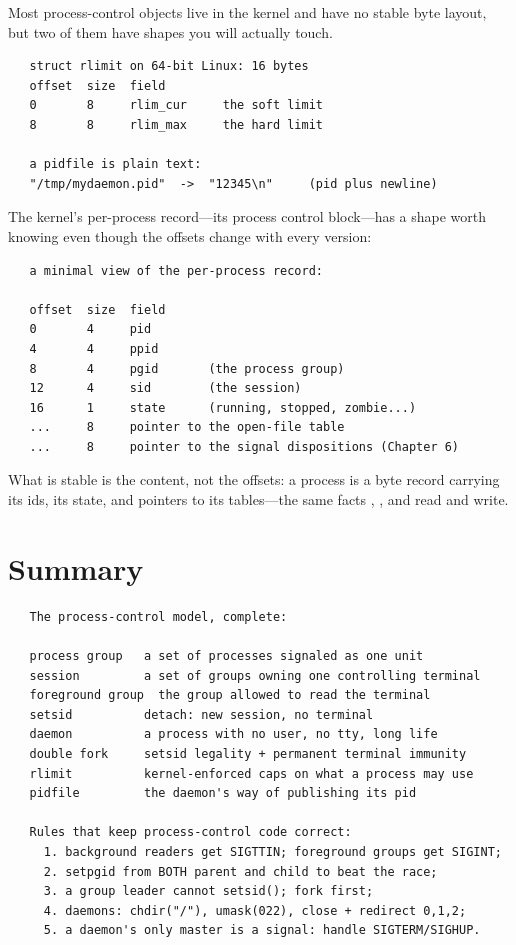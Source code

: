 Most process-control objects live in the kernel and have no stable
byte layout, but two of them have shapes you will actually touch.

\begin{verbatim}
   struct rlimit on 64-bit Linux: 16 bytes
   offset  size  field
   0       8     rlim_cur     the soft limit
   8       8     rlim_max     the hard limit

   a pidfile is plain text:
   "/tmp/mydaemon.pid"  ->  "12345\n"     (pid plus newline)
\end{verbatim}

The kernel's per-process record---its process control block---has a
shape worth knowing even though the offsets change with every version:

\begin{verbatim}
   a minimal view of the per-process record:

   offset  size  field
   0       4     pid
   4       4     ppid
   8       4     pgid       (the process group)
   12      4     sid        (the session)
   16      1     state      (running, stopped, zombie...)
   ...     8     pointer to the open-file table
   ...     8     pointer to the signal dispositions (Chapter 6)
\end{verbatim}

What is stable is the content, not the offsets: a process is a byte
record carrying its ids, its state, and pointers to its tables---the
same facts , , and 
read and write.

\section{Summary}

\begin{verbatim}
   The process-control model, complete:

   process group   a set of processes signaled as one unit
   session         a set of groups owning one controlling terminal
   foreground group  the group allowed to read the terminal
   setsid          detach: new session, no terminal
   daemon          a process with no user, no tty, long life
   double fork     setsid legality + permanent terminal immunity
   rlimit          kernel-enforced caps on what a process may use
   pidfile         the daemon's way of publishing its pid

   Rules that keep process-control code correct:
     1. background readers get SIGTTIN; foreground groups get SIGINT;
     2. setpgid from BOTH parent and child to beat the race;
     3. a group leader cannot setsid(); fork first;
     4. daemons: chdir("/"), umask(022), close + redirect 0,1,2;
     5. a daemon's only master is a signal: handle SIGTERM/SIGHUP.
\end{verbatim}


